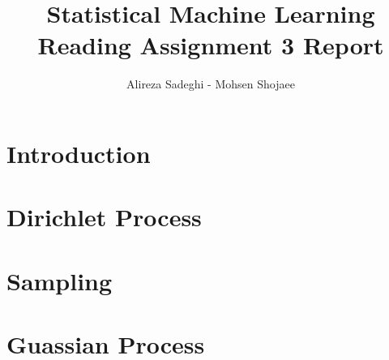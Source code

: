 \documentclass{article}
\title{Statistical Machine Learning \\ Reading Assignment 3 Report}
\author{Alireza Sadeghi - Mohsen Shojaee}
\begin{document}
\maketitle
    
\section{Introduction}

\section{Dirichlet Process}

\section{Sampling}

\section{Guassian Process}
\end{document}

